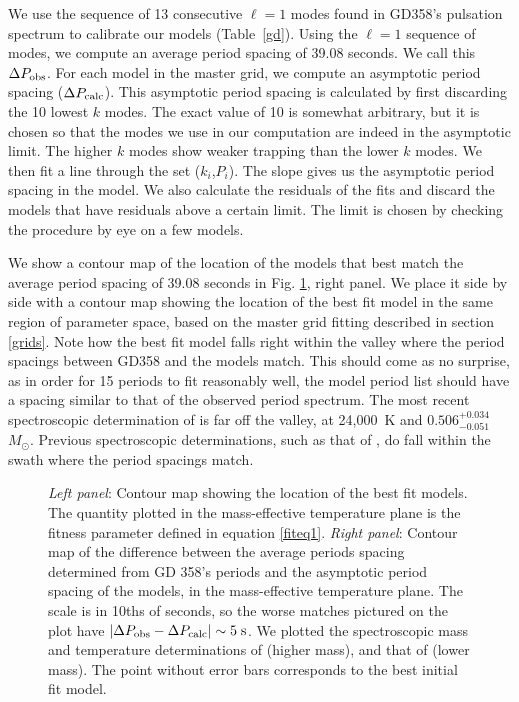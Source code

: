 \documentclass[12pt,preprint]{aastex}
\newcommand{\msun}{$M_\odot$}
\begin{document}
We use the sequence of 13 consecutive $\ell=1$ modes found in GD358's pulsation spectrum to calibrate our models (Table~\ref{gd}). 
Using the $\ell=1$ sequence of modes, we compute an average period spacing of 39.08 seconds. We call 
this $\Delta P_{\rm obs}$. For each model in the master grid, we compute an asymptotic period spacing 
($\Delta P_{\rm calc}$). This asymptotic period spacing is calculated by first discarding the 10 lowest $k$ modes. 
The exact value of 10 is somewhat arbitrary, but it is chosen so that the modes we use in 
our computation are indeed in the asymptotic limit. The higher $k$ modes show weaker trapping than the 
lower $k$ modes. We then fit a line through the set ($k_i$,$P_i$). The slope gives us the asymptotic 
period spacing in the model. We also calculate the residuals of the fits and discard the models that have 
residuals above a certain limit. The limit is chosen by checking the procedure 
by eye on a few models. 

We show a contour map of the location of the models that best match the average period spacing of 
39.08 seconds in Fig. \ref{ffit2}, right panel. We place it side by side with a contour map showing 
the location of the best fit model in the same region of parameter space, based on the master grid 
fitting described in section \ref{grids}. Note how the best fit model falls right within the valley 
where the period spacings between GD358 and the models match. This should come as no surprise, as in 
order for 15 periods to fit reasonably well, the model period list should have a spacing similar to 
that of the observed period spectrum. The most recent spectroscopic determination of \citet{Koester2013} 
is far off the valley, at 24,000~K and $0.506^{+0.034}_{-0.051}$ \msun. Previous spectroscopic determinations, 
such as that of \citet{Bergeron2011}, do fall within the swath where the period spacings match.

\begin{figure}
\caption{
{\it Left panel}: Contour map showing the location of the best fit models. The quantity plotted in 
the mass-effective temperature plane is the fitness parameter defined in equation \ref{fiteq1}. 
{\it Right panel}: Contour map of the difference between the average 
periods spacing determined from GD 358's periods and the asymptotic period spacing of the models, 
in the mass-effective temperature plane. The scale is in 10ths of seconds, so the worse matches 
pictured on the plot have $\left|\Delta P_{\rm obs}- \Delta P_{\rm calc}\right| \sim 5 \; \rm s$. 
We plotted the spectroscopic mass and temperature determinations of \citet{Bergeron2011} (higher mass), 
and that of \citet{Koester2013} (lower mass). The point without error bars corresponds to the 
best initial fit model. \label{ffit2}
}
\end{figure}
\end{document}
